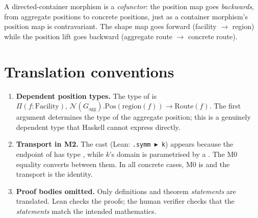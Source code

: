 \documentclass[11pt,a4paper]{article}
\begin{document}
\begin{fidelitynote}
A directed-container morphism is a \emph{cofunctor}: the position map goes
\emph{backwards}, from aggregate positions to concrete positions, just as a
container morphism's position map is contravariant.  The shape map goes
forward (facility $\to$ region) while the position lift goes backward (aggregate
route $\to$ concrete route).
\end{fidelitynote}


\section{Translation conventions}

\begin{enumerate}
\item \textbf{Dependent position types.}  The type of  is
  $\Pi(f : \mathrm{Facility}),\, \mathcal{N}(G_{\mathrm{agg}}).\mathrm{Pos}(\mathrm{region}(f)) \to \mathrm{Route}(f)$.
  The first argument determines the type of the aggregate position; this is a
  genuinely dependent type that Haskell cannot express directly.

\item \textbf{Transport in M2.}  The cast  (Lean: \texttt{.symm \(\blacktriangleright\) k})
  appears because the endpoint of  has type ,
  while $k$'s domain is parametrised by a .  The M0 equality
  converts between them.  In all concrete cases, M0 is  and the
  transport is the identity.

\item \textbf{Proof bodies omitted.}  Only definitions and theorem
  \emph{statements} are translated.  Lean checks the proofs; the human
  verifier checks that the \emph{statements} match the intended mathematics.
\end{enumerate}
\end{document}

